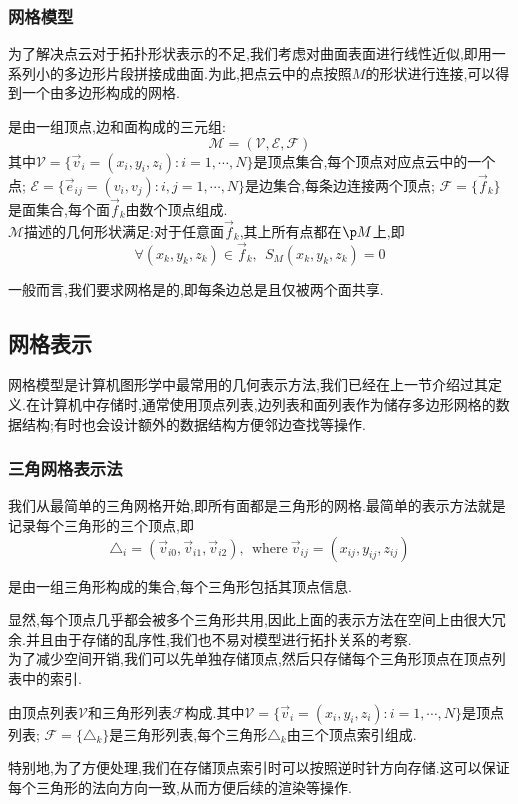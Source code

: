 \documentclass{ctexart}
\begin{document}
\subsubsection{网格模型}
为了解决点云对于拓扑形状表示的不足,我们考虑对曲面表面进行线性近似,即用一系列小的多边形片段拼接成曲面.为此,把点云中的点按照$M$的形状进行连接,可以得到一个由多边形构成的网格.
\begin{definition}[网格模型]
    是由一组顶点,边和面构成的三元组:
    \[\mathcal{M}=(\mathcal{V},\mathcal{E},\mathcal{F})\]
    其中$\mathcal{V}=\{\vec{v}_i=(x_i,y_i,z_i):i=1,\cdots,N\}$是顶点集合,每个顶点对应点云中的一个点; $\mathcal{E}=\{\vec{e}_{ij}=(v_i,v_j):i,j=1,\cdots,N\}$是边集合,每条边连接两个顶点; $\mathcal{F}=\{\vec{f}_k\}$是面集合,每个面$\vec{f}_k$由数个顶点组成.\\
    $\mathcal{M}$描述的几何形状满足:对于任意面$\vec{f}_k$,其上所有点都在$\p M$上,即
    \[\forall\left(x_k,y_k,z_k\right)\in\vec{f}_k,\ \ S_M\left(x_k,y_k,z_k\right)=0\]
\end{definition}
一般而言,我们要求网格是的,即每条边总是且仅被两个面共享.
\subsection{网格表示}
网格模型是计算机图形学中最常用的几何表示方法,我们已经在上一节介绍过其定义.在计算机中存储时,通常使用顶点列表,边列表和面列表作为储存多边形网格的数据结构;有时也会设计额外的数据结构方便邻边查找等操作.
\subsubsection{三角网格表示法}
我们从最简单的三角网格开始,即所有面都是三角形的网格.最简单的表示方法就是记录每个三角形的三个顶点,即\[\triangle_i=\left(\vec{v}_{i0},\vec{v}_{i1},\vec{v}_{i2}\right),\ \ \text{where}\ \vec{v}_{ij}=\left(x_{ij},y_{ij},z_{ij}\right)\]
\begin{definition}[三角形乱序集合]
    是由一组三角形构成的集合,每个三角形包括其顶点信息.
\end{definition}
显然,每个顶点几乎都会被多个三角形共用,因此上面的表示方法在空间上由很大冗余.并且由于存储的乱序性,我们也不易对模型进行拓扑关系的考察.\\
\indent 为了减少空间开销,我们可以先单独存储顶点,然后只存储每个三角形顶点在顶点列表中的索引.
\begin{definition}[索引三角形网格]
    由顶点列表$\mathcal{V}$和三角形列表$\mathcal{F}$构成.其中$\mathcal{V}=\{\vec{v}_i=(x_i,y_i,z_i):i=1,\cdots,N\}$是顶点列表; $\mathcal{F}=\{\triangle_k\}$是三角形列表,每个三角形$\triangle_k$由三个顶点索引组成.
\end{definition}
特别地,为了方便处理,我们在存储顶点索引时可以按照逆时针方向存储.这可以保证每个三角形的法向方向一致,从而方便后续的渲染等操作.
\end{document}
